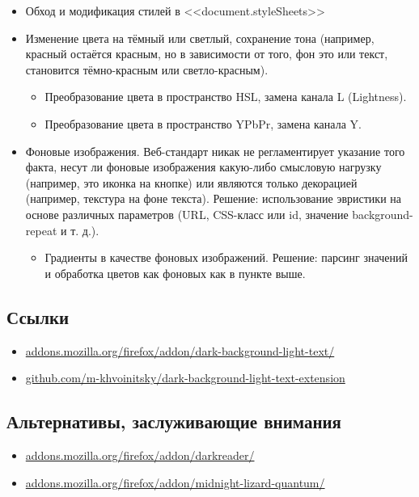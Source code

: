 \documentclass[10pt, a5paper]{article}
\begin{document}
\begin{itemize}
  \item Обход и модификация стилей в <<document.styleSheets>>
  \item Изменение цвета на тёмный или светлый, сохранение тона (например, красный остаётся красным, но в зависимости от того, фон это или текст, становится тёмно-красным или светло-красным).
\begin{itemize}
  \item Преобразование цвета в пространство HSL, замена канала L (Lightness).
  \item Преобразование цвета в пространство YPbPr, замена канала Y.
\end{itemize}


  \item Фоновые изображения. Веб-стандарт никак не регламентирует указание того факта, несут ли фоновые изображения какую-либо смысловую нагрузку (например, это иконка на кнопке) или являются только декорацией (например, текстура на фоне текста). Решение: использование эвристики на основе различных параметров (URL, CSS-класс или id, значение background-repeat и т. д.).
\begin{itemize}
  \item Градиенты в качестве фоновых изображений. Решение: парсинг значений и обработка цветов как фоновых как в пункте выше.
\end{itemize}
\end{itemize}

\subsection*{Ссылки}

\begin{itemize}
  \item \href{https://addons.mozilla.org/firefox/addon/dark-background-light-text/}{addons.mozilla.org/firefox/addon/dark-background-light-text/}
  \item \href{https://github.com/m-khvoinitsky/dark-background-light-text-extension}{github.com/m-khvoinitsky/dark-background-light-text-extension}
\end{itemize}

\subsection*{Альтернативы, заслуживающие внимания}

\begin{itemize}
  \item \href{https://addons.mozilla.org/firefox/addon/darkreader/}{addons.mozilla.org/firefox/addon/darkreader/}
  \item \href{https://addons.mozilla.org/firefox/addon/midnight-lizard-quantum/}{addons.mozilla.org/firefox/addon/midnight-lizard-quantum/}
\end{itemize}
\end{document}
